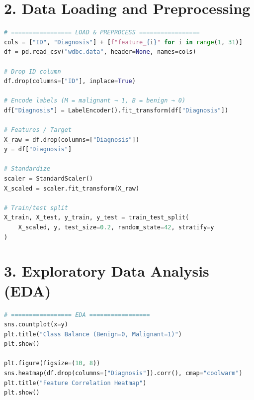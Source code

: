 \documentclass[12pt]{article}
\begin{document}
\section*{2. Data Loading and Preprocessing}
\begin{lstlisting}[language=Python]
# ================= LOAD & PREPROCESS =================
cols = ["ID", "Diagnosis"] + [f"feature_{i}" for i in range(1, 31)]
df = pd.read_csv("wdbc.data", header=None, names=cols)

# Drop ID column
df.drop(columns=["ID"], inplace=True)

# Encode labels (M = malignant → 1, B = benign → 0)
df["Diagnosis"] = LabelEncoder().fit_transform(df["Diagnosis"])

# Features / Target
X_raw = df.drop(columns=["Diagnosis"])
y = df["Diagnosis"]

# Standardize
scaler = StandardScaler()
X_scaled = scaler.fit_transform(X_raw)

# Train/test split
X_train, X_test, y_train, y_test = train_test_split(
    X_scaled, y, test_size=0.2, random_state=42, stratify=y
)
\end{lstlisting}

\section*{3. Exploratory Data Analysis (EDA)}
\begin{lstlisting}[language=Python]
# ================= EDA =================
sns.countplot(x=y)
plt.title("Class Balance (Benign=0, Malignant=1)")
plt.show()

plt.figure(figsize=(10, 8))
sns.heatmap(df.drop(columns=["Diagnosis"]).corr(), cmap="coolwarm")
plt.title("Feature Correlation Heatmap")
plt.show()
\end{lstlisting}
\end{document}
